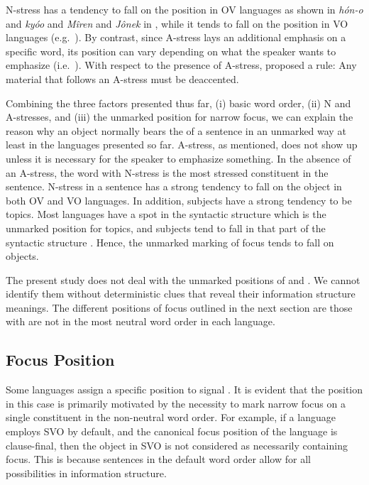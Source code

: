 \noindent N-stress has a tendency to fall on the 
position in OV languages as shown in \textit{h\'on-o} and
\textit{ky{\'o}o}  and \textit{M\^{i}ren} and
\textit{J\^{o}nek} in , while it tends to
fall on the  position in VO languages
(e.g.\ ). By contrast, since A-stress lays an additional
emphasis on a specific word, its position can vary depending on what
the speaker wants to emphasize (i.e.\ ). With respect to the
presence of A-stress, \citeauthor{ishihara:01} proposed a rule: Any
material that follows an A-stress must be deaccented.



Combining the three factors presented thus far, (i) basic word order,
(ii) N and A-stresses, and (iii) the unmarked position for narrow
focus, we can explain the reason why an object normally bears the
 of a sentence in an unmarked way at least in the languages
presented so far.  A-stress, as mentioned, does not show up unless it
is necessary for the speaker to emphasize something.  In the absence
of an A-stress, the word with N-stress is the most stressed
constituent in the sentence.  N-stress in a sentence has a strong
tendency to fall on the object in both OV and VO languages. In
addition, subjects have a strong tendency to be topics. Most languages
have a spot in the syntactic structure which is the unmarked position
for topics, and subjects tend to fall in that part of the syntactic
structure \citep{lambrecht:96}. Hence, the unmarked marking of focus
tends to fall on objects.


The present study does not deal with the unmarked positions of 
and . We cannot identify them without deterministic clues that
reveal their information structure meanings. The different positions
of focus outlined in the next section are those with are not in the
most neutral word order in each language.



\subsection{Focus Position}
\label{4:ssec:focus-position}

Some languages assign a specific position to signal . It is
evident that the position in this case is primarily motivated by the
necessity to mark narrow focus on a single constituent in the
non-neutral word order. For example, if a language employs SVO by
default, and the canonical focus position of the language is
clause-final, then the object in SVO is not considered as necessarily
containing focus. This is because sentences in the
default word order allow for all possibilities in information
structure.



